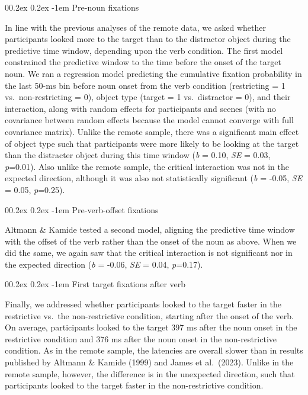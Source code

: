 \documentclass[
  man,floatsintext]{apa6}
\makeatletter
\let\oldparagraph\paragraph
\renewcommand{\paragraph}[1]{\oldparagraph{#1}\mbox{}}
\renewcommand{\paragraph}{\@startsection{paragraph}{4}{\parindent}%
  {0\baselineskip \@plus 0.2ex \@minus 0.2ex}%
  {-1em}%
  {\normalfont\normalsize\bfseries\itshape\typesectitle}}
\makeatother
\begin{document}
\paragraph{Pre-noun fixations}\label{pre-noun-fixations-1}

In line with the previous analyses of the remote data, we asked whether participants looked more to the target than to the distractor object during the predictive time window, depending upon the verb condition. The first model constrained the predictive window to the time before the onset of the target noun. We ran a regression model predicting the cumulative fixation probability in the last 50-ms bin before noun onset from the verb condition (restricting = 1 vs.~non-restricting = 0), object type (target = 1 vs.~distractor = 0), and their interaction, along with random effects for participants and scenes (with no covariance between random effects because the model cannot converge with full covariance matrix). Unlike the remote sample, there was a significant main effect of object type such that participants were more likely to be looking at the target than the distracter object during this time window (\emph{b} = 0.10, \emph{SE} = 0.03, \emph{p}=0.01). Also unlike the remote sample, the critical interaction was not in the expected direction, although it was also not statistically significant (\emph{b} = -0.05, \emph{SE} = 0.05, \emph{p}=0.25).

\paragraph{Pre-verb-offset fixations}\label{pre-verb-offset-fixations-1}

Altmann \& Kamide tested a second model, aligning the predictive time window with the offset of the verb rather than the onset of the noun as above. When we did the same, we again saw that the critical interaction is not significant nor in the expected direction (\emph{b} = -0.06, \emph{SE} = 0.04, \emph{p}=0.17).

\paragraph{First target fixations after verb}\label{first-target-fixations-after-verb-1}

Finally, we addressed whether participants looked to the target faster in the restrictive vs.~the non-restrictive condition, starting after the onset of the verb. On average, participants looked to the target 397 ms after the noun onset in the restrictive condition and 376 ms after the noun onset in the non-restrictive condition. As in the remote sample, the latencies are overall slower than in results published by Altmann \& Kamide (1999) and James et al.~(2023). Unlike in the remote sample, however, the difference is in the unexpected direction, such that participants looked to the target faster in the non-restrictive condition.
\end{document}
